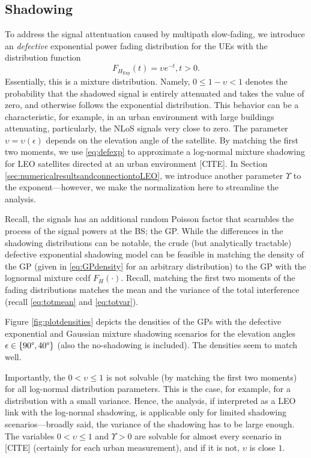\documentclass[lettersize,journal]{IEEEtran}
\begin{document}
\subsection{Shadowing}
To address the signal attentuation caused by multipath slow-fading, we introduce an \textit{defective} exponential power fading distribution for the UEs with the distribution function
\begin{equation}
  \label{eq:defexp}
  F_{{H}_{\text{Exp}}}(t) = \upsilon e^{-t}, t>0.
\end{equation}
Essentially, this is a mixture distribution. Namely, $0 \leq 1-\upsilon < 1$ denotes the probability that the shadowed signal is entirely attenuated and takes the value of zero, and otherwise follows the exponential distribution. This behavior can be a characteristic, for example, in an urban environment with large buildings attenuating, particularly, the NLoS signals very close to zero. The parameter $\upsilon = \upsilon(\epsilon)$ depends on the elevation angle of the satellite. By matching the first two moments, we use \eqref{eq:defexp} to approximate a log-normal mixture shadowing for LEO satellites directed at an urban environment [CITE]. In Section \ref{sec:numericalresultsandconnectiontoLEO}, we introduce another parameter $\Upsilon$ to the exponent---however, we make the normalization here to streamline the analysis.



Recall, the signals has an additional random Poisson factor that scarmbles the process of the signal powers at the BS; the GP. While the differences in the shadowing distributions can be notable, the crude (but analytically tractable) defective exponential shadowing model can be feasible in matching the density of the GP (given in \eqref{eq:GPdensity} for an arbitrary distribution) to the GP with the lognormal mixture ccdf $F_H(\cdot)$. Recall, matching the first two moments of the fading distributions matches the mean and the variance of the total interference (recall \eqref{eq:totmean} and \eqref{eq:totvar}).

Figure \ref{fig:plotdensities} depicts the densities of the GPs with the defective exponential and Gaussian mixture shadowing scenarios for the elevation angles $\epsilon \in \{90 \degree, 40 \degree \}$ (also the no-shadowing is included). The densities seem to match well.

Importantly, the  $0 < \upsilon \leq 1$ is not solvable (by matching the first two moments) for all log-normal distribution parameters. This is the case, for example, for a distribution with a small variance. Hence, the analysis, if interpreted as a LEO link with the log-normal shadowing, is applicable only for limited shadowing scenarios---broadly said, the variance of the shadowing has to be large enough. The variables $0<\upsilon \leq 1$ and $\Upsilon>0$ are solvable for almost every scenario in [CITE] (certainly for each urban measurement), and if it is not, $\upsilon$ is close $1$.
\end{document}

